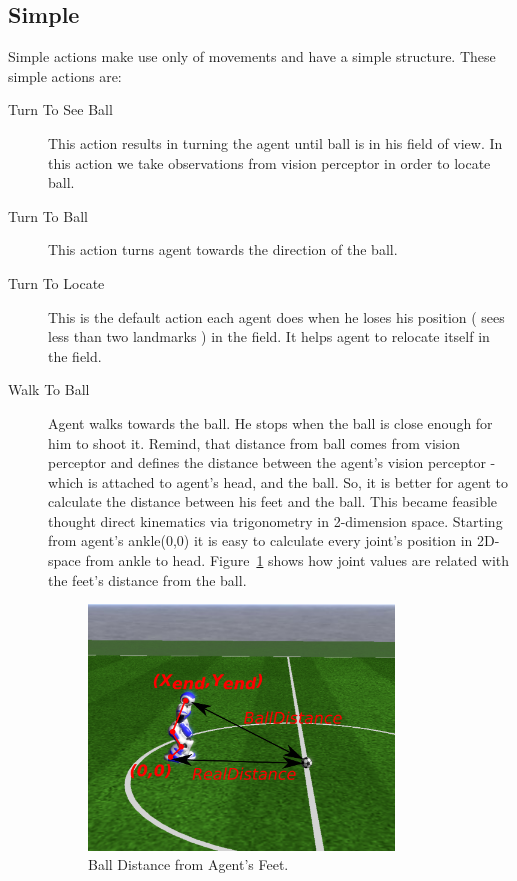 \subsection{Simple}
Simple actions make use only of movements and have a simple structure. These simple actions are:
\begin{description}
 \item[Turn To See Ball] This action results in turning the agent until ball is in his field of view. In this action we take observations from vision perceptor in order to locate ball.
 
 \item[Turn To Ball] This action turns agent towards the direction of the ball.
 
 \item[Turn To Locate] This is the default action each agent does when he loses his position ( sees less than two landmarks ) in the field. It helps agent to relocate itself in the field.
 
 \item[Walk To Ball] Agent walks towards the ball. He stops when the ball is close enough for him to shoot it. Remind, that distance from ball comes from vision perceptor and defines the distance between the agent's vision perceptor - which is attached to agent's head, and the ball. So, it is better for agent to calculate the distance between his feet and the ball. This became feasible thought direct kinematics via trigonometry in 2-dimension space. Starting from agent's ankle(0,0) it is easy to calculate every joint's position in 2D-space from ankle to head. Figure~\ref{fig:2dkinematics} shows how joint values are related with the feet's distance from the ball.
 
 \begin{figure}[t!]
\centering
  \includegraphics[trim=0cm 4cm 0cm 4cm, clip,width=0.8\textwidth]   {Chapter3/figures/2dkinematics.pdf}
  \caption{Ball Distance from Agent's Feet.}
  \label{fig:2dkinematics}
\end{figure}



\end{description}
